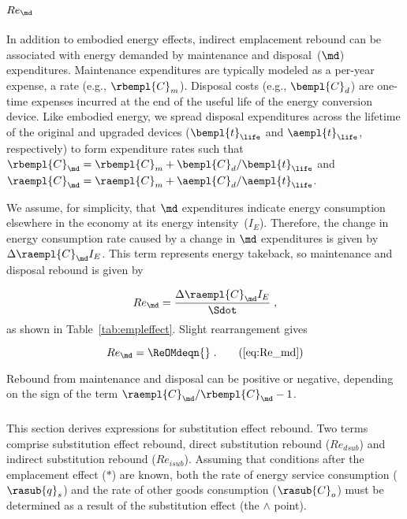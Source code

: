 \paragraph{$Re_{\md}$} 
\label{sec:Re_OMd}

In addition to embodied energy effects, 
indirect emplacement rebound 
can be associated with energy demanded by maintenance and disposal~($\md$) expenditures.
Maintenance expenditures are typically modeled as a per-year expense, 
a rate (e.g., $\rbempl{C}_m$).
Disposal costs (e.g., $\bempl{C}_d$) are one-time expenses incurred 
at the end of the useful life of the energy conversion device.
Like embodied energy, we spread disposal expenditures across the lifetime 
of the original and upgraded devices ($\bempl{t}_{\life}$ and $\aempl{t}_{\life}$, respectively)
to form expenditure rates such that 
$\rbempl{C}_{\md} = \rbempl{C}_m + \bempl{C}_d/\bempl{t}_{\life}$
and
$\raempl{C}_{\md} = \raempl{C}_m + \aempl{C}_d/\aempl{t}_{\life}$.

We assume, for simplicity, that $\md$ expenditures indicate energy consumption
elsewhere in the economy at its energy intensity~($I_E$).
Therefore, the change in energy consumption rate caused by a change in $\md$ expenditures
is given by $\Delta \raempl{C}_{\md} I_E$.
This term represents energy takeback, so maintenance and disposal rebound is given by

\begin{equation} \label{eq:Re_md_def}
  Re_{\md} = \frac{\Delta \raempl{C}_{\md} I_E}{\Sdot} \; ,
\end{equation}
%
as shown in Table~\ref{tab:empleffect}.
Slight rearrangement gives

\begin{equation}
  Re_{\md} = \ReOMdeqn{} \; . \tag{\ref{eq:Re_md}}
\end{equation}

Rebound from maintenance and disposal can be positive or negative,
depending on the sign of the term $\raempl{C}_{\md}/\rbempl{C}_{\md} - 1$.


\subsubsection{\Subeffect{}} 
\label{sec:Re_sub}

This section derives expressions for substitution effect rebound.
Two terms comprise substitution effect rebound,
direct substitution rebound ($Re_{dsub}$) and
indirect substitution rebound ($Re_{isub}$).
Assuming that conditions after the emplacement effect ($*$) are known, 
both the 
rate of energy service consumption ($\rasub{q}_s$) and
the rate of other goods consumption ($\rasub{C}_o$) 
must be determined as a result of the substitution effect
(the $\wedge$ point).

